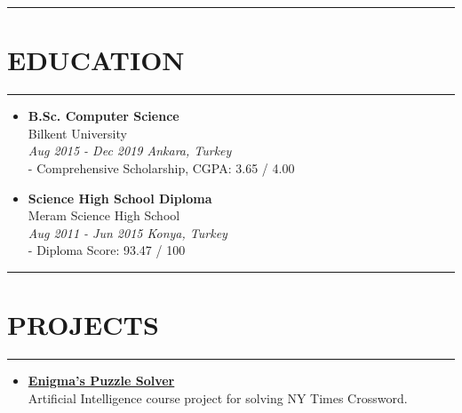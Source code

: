 \documentclass[11 pt, a4paper, usenames, dvipsnames]{article}
\newcommand*{\RoleFont}{%
      \fontsize{14}{8}%
\color{Black}%
\bf
      \selectfont}
\newcommand*{\DateFont}{%
      \fontsize{9.5}{8}%
\color{Gray}%
\it
      \selectfont}
\newcommand*{\SectionFont}{%
      \fontsize{16}{5}%
\color{BrickRed}%
\bf
      \selectfont}
\begin{document}
\begin{paracol}{2}
\switchcolumn[1]

\par\noindent\rule{0.22\textwidth}{0.4pt}\vspace{-12pt}
\section*{\SectionFont\faMortarBoard\enskip EDUCATION}\vspace{-15pt}
\par\noindent\rule{0.22\textwidth}{0.4pt}
\begin{itemize}[leftmargin=0pt,align=left,labelwidth=\parindent,labelsep=0pt]
\item[] {\RoleFont B.Sc. Computer Science} \\
\normalfont Bilkent University \\
{\DateFont Aug 2015 - Dec 2019 \hfill Ankara, Turkey }\\
{\color{BrickRed}\LARGE - }Comprehensive Scholarship, CGPA: 3.65 / 4.00 


\item[] {\RoleFont Science High School Diploma} \\
\normalfont Meram Science High School \\
{\DateFont Aug 2011 - Jun 2015 \hfill Konya, Turkey }\\
{\color{BrickRed}\LARGE - }Diploma Score: 93.47 / 100
\end{itemize}

\par\noindent\rule{0.18\textwidth}{0.4pt}\vspace{-12pt}
\section*{\SectionFont\faPaperPlane\enskip PROJECTS}\vspace{-15pt}
\par\noindent\rule{0.18\textwidth}{0.4pt}

\begin{itemize}[leftmargin=0pt,align=left,labelwidth=\parindent,labelsep=0pt]
\item[] \href{https://github.com/KeremAyoz/EnigmaPuzzleSolver}{\textbf{Enigma's Puzzle Solver}} \verb||\faGithub \\ 
Artificial Intelligence course project for solving NY Times  Crossword. 


\end{itemize}
\end{paracol}
\end{document}
